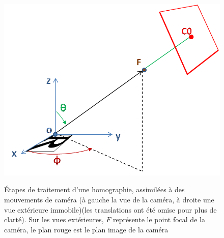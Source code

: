 \begin{figure}
{		{\includegraphics[scale=0.5]{vue_tps_hom_part.png}}}\\
		\caption{Étapes de traitement d'une homographie, assimilées à des mouvements de caméra (à gauche la vue de la caméra, à droite une vue extérieure immobile)(les translations ont été omise pour plus de clarté). Sur les vues extérieures, $F$ représente le point focal de la caméra, le plan rouge est le plan image de la caméra}
	\end{figure}
\clearpage
